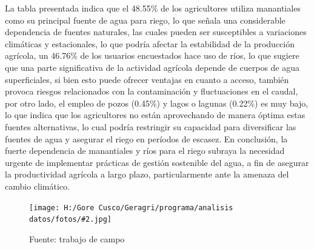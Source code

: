 \documentclass{article}\usepackage[]{graphicx}\usepackage[table]{xcolor}
\newenvironment{fotos}[2]
{\begin{figure}[H]
	\centering
	\caption{#1}
	\texttt{[image: H:/Gore Cusco/Geragri/programa/analisis datos/fotos/\#2.jpg]}
	\caption*{Fuente: trabajo de campo}}
{\end{figure}}
\begin{document}
La tabla presentada indica que el 48.55\% de los agricultores utiliza manantiales como su principal fuente de agua para riego, lo que señala una considerable dependencia de fuentes naturales, las cuales pueden ser susceptibles a variaciones climáticas y estacionales, lo que podría afectar la estabilidad de la producción agrícola, un 46.76\% de los usuarios encuestados hace uso de ríos, lo que sugiere que una parte significativa de la actividad agrícola depende de cuerpos de agua superficiales, si bien esto puede ofrecer ventajas en cuanto a acceso, también provoca riesgos relacionados con la contaminación y fluctuaciones en el caudal, por otro lado, el empleo de pozos (0.45\%) y lagos o lagunas (0.22\%) es muy bajo, lo que indica que los agricultores no están aprovechando de manera óptima estas fuentes alternativas, lo cual podría restringir su capacidad para diversificar las fuentes de agua y asegurar el riego en períodos de escasez. En conclusión, la fuerte dependencia de manantiales y ríos para el riego subraya la necesidad urgente de implementar prácticas de gestión sostenible del agua, a fin de asegurar la productividad agrícola a largo plazo, particularmente ante la amenaza del cambio climático.
\begin{fotos}
{reconocimiento en campo}{18}
\end{fotos}
\end{document}
